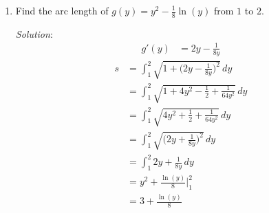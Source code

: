 \documentclass[16pt]{article}
\theoremstyle{remark}
\begin{document}
\begin{enumerate}
\item  Find the arc length of  $\displaystyle{g(y) = y^2 - \frac{1}{8}\ln(y)}$ from $\displaystyle{1}$ to $2$.
\begin{mdframed}[style=TheoremFrame]
\textit{Solution}:
\vspace*{-0.5cm}
\begin{align*}
g'(y) &= 2y-\frac{1}{8y}
\end{align*}
\vspace*{-0.5cm}
\begin{align*}
s &= \int_1^2 \sqrt{1+\bigg(2y-\frac{1}{8y}\bigg)^2}\, dy\\
&= \int_1^2 \sqrt{1+4y^2-\frac{1}{2}+\frac{1}{64y^2}}\, dy\\
&= \int_1^2 \sqrt{4y^2+\frac{1}{2}+\frac{1}{64y^2}}\, dy\\
&= \int_1^2 \sqrt{\bigg(2y+\frac{1}{8y}\bigg)^2}\, dy\\
&= \int_1^2 2y+\frac{1}{8y}\, dy\\
&= y^2 + \frac{\ln(y)}{8} \bigg|_1^2\\
&= 3+\frac{\ln(y)}{8}
\end{align*}

\end{mdframed}
\newpage
\end{enumerate}
\end{document}

